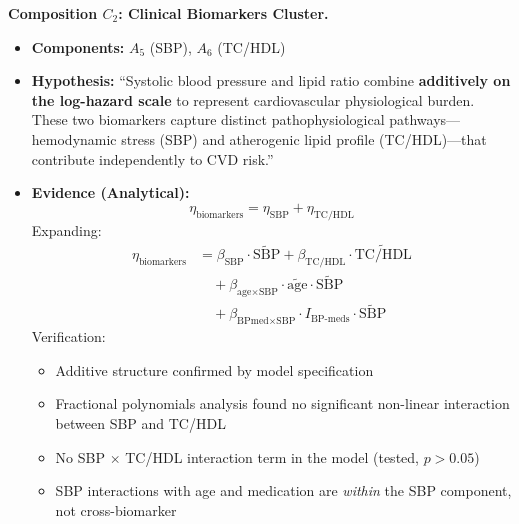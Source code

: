 \documentclass{article}
\begin{document}
\textbf{Composition $C_2$: Clinical Biomarkers Cluster.}
\begin{itemize}
    \item \textbf{Components:} $A_5$ (SBP), $A_6$ (TC/HDL)
    \item \textbf{Hypothesis:} ``Systolic blood pressure and lipid ratio combine \textbf{additively on the log-hazard scale} to represent cardiovascular physiological burden. These two biomarkers capture distinct pathophysiological pathways---hemodynamic stress (SBP) and atherogenic lipid profile (TC/HDL)---that contribute independently to CVD risk.''
    \item \textbf{Evidence (Analytical):}
    \[
    \eta_{\text{biomarkers}} = \eta_{\text{SBP}} + \eta_{\text{TC/HDL}}
    \]
    Expanding:
    \begin{align*}
    \eta_{\text{biomarkers}} &= \beta_{\text{SBP}} \cdot \widetilde{\text{SBP}} + \beta_{\text{TC/HDL}} \cdot \widetilde{\text{TC/HDL}} \\
    &\quad + \beta_{\text{age} \times \text{SBP}} \cdot \tilde{\text{age}} \cdot \widetilde{\text{SBP}} \\
    &\quad + \beta_{\text{BPmed} \times \text{SBP}} \cdot I_{\text{BP-meds}} \cdot \widetilde{\text{SBP}}
    \end{align*}
    Verification:
    \begin{itemize}
        \item Additive structure confirmed by model specification
        \item Fractional polynomials analysis found no significant non-linear interaction between SBP and TC/HDL
        \item No SBP $\times$ TC/HDL interaction term in the model (tested, $p > 0.05$)
        \item SBP interactions with age and medication are \emph{within} the SBP component, not cross-biomarker
    \end{itemize}
\end{itemize}
\end{document}
